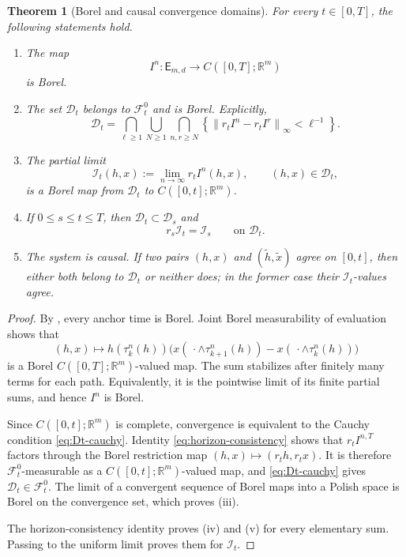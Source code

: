 \documentclass[11pt,reqno]{amsart}
\theoremstyle{plain}
\newtheorem{theorem}{Theorem}[section]
\theoremstyle{definition}
\newcommand{\R}{\mathbb R}
\newcommand{\cD}{\mathcal D}
\newcommand{\cF}{\mathcal F}
\newcommand{\cI}{\mathcal I}
\newcommand{\norm}[1]{\left\lVert #1\right\rVert}
\begin{document}
\begin{theorem}[Borel and causal convergence domains]
\label{thm:borel-domain}
For every \(t\in[0,T]\), the following statements hold.

\begin{enumerate}[label=(\roman*),leftmargin=2.2em]
  \item The map
  \[
    I^n:\mathsf E_{m,d}\longrightarrow C([0,T];\R^m)
  \]
  is Borel.

  \item The set \(\cD_t\) belongs to \(\cF_t^0\) and is Borel.  Explicitly,
  \begin{equation}\label{eq:Dt-cauchy}
    \cD_t
    =
    \bigcap_{\ell\ge1}
    \bigcup_{N\ge1}
    \bigcap_{n,r\ge N}
    \left\{
      \norm{r_tI^n-r_tI^r}_{\infty}<\ell^{-1}
    \right\}.
  \end{equation}

  \item The partial limit
  \begin{equation}\label{eq:It-partial}
    \cI_t(h,x)
    :=
    \lim_{n\to\infty}r_tI^n(h,x),
    \qquad (h,x)\in\cD_t,
  \end{equation}
  is a Borel map from \(\cD_t\) to \(C([0,t];\R^m)\).

  \item If \(0\le s\le t\le T\), then
  \(\cD_t\subset\cD_s\) and
  \begin{equation}\label{eq:projective-integral}
    r_s\cI_t=\cI_s\qquad\text{on }\cD_t.
  \end{equation}

  \item The system is causal.  If two pairs \((h,x)\) and
  \((\widetilde h,\widetilde x)\) agree on \([0,t]\), then either both belong
  to \(\cD_t\) or neither does; in the former case their \(\cI_t\)-values
  agree.
\end{enumerate}
\end{theorem}

\begin{proof}
By , every anchor time is Borel.  Joint Borel
measurability of evaluation shows that
\[
  (h,x)\longmapsto
  h(\tau_k^n(h))
  \bigl(
    x(\,\cdot\wedge\tau_{k+1}^n(h))
    -
    x(\,\cdot\wedge\tau_k^n(h))
  \bigr)
\]
is a Borel \(C([0,T];\R^m)\)-valued map.  The sum stabilizes after finitely
many terms for each path.  Equivalently, it is the pointwise limit of its
finite partial sums, and hence \(I^n\) is Borel.

Since \(C([0,t];\R^m)\) is complete, convergence is equivalent to the Cauchy
condition \eqref{eq:Dt-cauchy}.  Identity
\eqref{eq:horizon-consistency} shows that \(r_tI^{n,T}\) factors through the
Borel restriction map \((h,x)\mapsto(r_th,r_tx)\).  It is therefore
\(\cF_t^0\)-measurable as a \(C([0,t];\R^m)\)-valued map, and
\eqref{eq:Dt-cauchy} gives \(\cD_t\in\cF_t^0\).  The limit of a convergent
sequence of Borel maps into a Polish space is Borel on the convergence set,
which proves (iii).

The horizon-consistency identity proves (iv) and (v) for every elementary
sum.  Passing to the uniform limit proves them for \(\cI_t\).
\end{proof}
\end{document}
